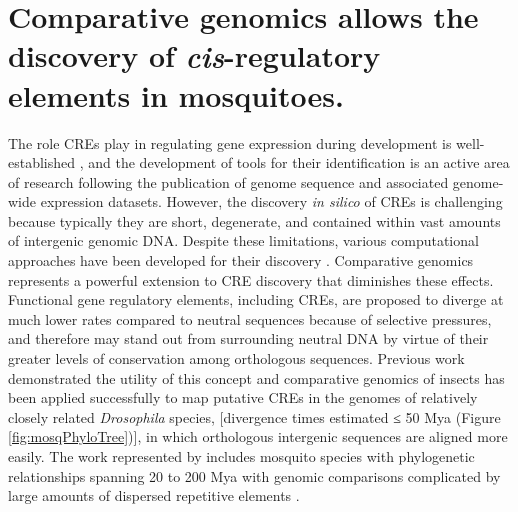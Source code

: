 \section{Comparative genomics allows the discovery of \textit{cis}-regulatory elements in mosquitoes. \cite{Sieglaff2009}}






The role \glspl{CRE} play in regulating gene expression during development is well-established \cite{Davidson2010}, and the development of tools for their identification is an active area of research following the publication of genome sequence and associated genome-wide expression datasets. However, the discovery \textit{in silico} of \glspl{CRE} is challenging because typically they are short, degenerate, and contained within vast amounts of intergenic genomic DNA. Despite these limitations, various computational approaches have been developed for their discovery \cite{Das2007a,Hu2005,Tompa2005,Wasserman2004}. Comparative genomics represents a powerful extension to \gls{CRE} discovery that diminishes these effects. Functional gene regulatory elements, including \glspl{CRE}, are proposed to diverge at much lower rates compared to neutral sequences because of selective pressures, and therefore may stand out from surrounding neutral DNA by virtue of their greater levels of conservation among orthologous sequences. Previous work demonstrated the utility of this concept \cite{Elemento2005,Stark2007,Xie2005} and comparative genomics of insects has been applied successfully to map putative \glspl{CRE} in the genomes of relatively closely related \textit{Drosophila} species, [divergence times estimated ≤ 50 \gls{Mya} \cite{Stark2007} (Figure \ref{fig:mosqPhyloTree})], in which orthologous intergenic sequences are aligned more easily. The work represented by \citet{Sieglaff2009} includes mosquito species with phylogenetic relationships spanning 20 to 200 \gls{Mya} with genomic comparisons complicated by large amounts of dispersed repetitive elements \cite{Nene2007}.

